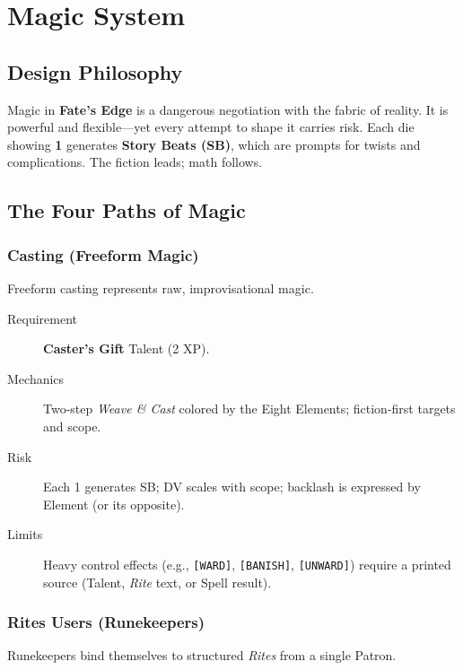 \chapter{Magic System}
\label{chap:magic-system}

\section{Design Philosophy}
\label{sec:magic-philosophy}

Magic in \textbf{Fate's Edge} is a dangerous negotiation with the fabric of reality. It is powerful and flexible—yet every attempt to shape it carries risk. Each die showing \textbf{1} generates \textbf{Story Beats (SB)}, which are prompts for twists and complications. The fiction leads; math follows.

\section{The Four Paths of Magic}
\label{sec:four-paths}

\subsection{Casting (Freeform Magic)}
\label{subsec:freeform-casting}

Freeform casting represents raw, improvisational magic.

\begin{description}
\item[Requirement] \textbf{Caster's Gift} Talent (2 XP).
\item[Mechanics] Two-step \emph{Weave \& Cast} colored by the Eight Elements; fiction-first targets and scope.
\item[Risk] Each 1 generates SB; DV scales with scope; backlash is expressed by Element (or its opposite).
\item[Limits] Heavy control effects (e.g., \texttt{[WARD]}, \texttt{[BANISH]}, \texttt{[UNWARD]}) require a printed source (Talent, \emph{Rite} text, or Spell result).
\end{description}

\subsection{Rites Users (Runekeepers)}
\label{subsec:runekeepers}

Runekeepers bind themselves to structured \emph{Rites} from a single Patron.

